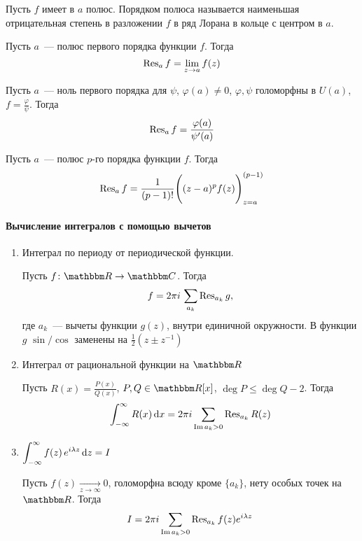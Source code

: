 \documentclass[12pt,timbord]{../../../notes}
\begin{document}
\begin{defn}\label{defn:tfcv::resuduepole::polord}
  Пусть $f$ имеет в $a$ полюс.
  Порядком полюса называется наименьшая отрицательная степень в разложении $f$ в ряд Лорана в
  кольце с центром в $a$.
\end{defn}

\begin{thrm}\label{thrm:tfcv::resuduepole::firt}
  Пусть $a$~--- полюс первого порядка функции $f$. Тогда
  \[
    \operatorname{Res}_a f =  \lim_{z\to a} f(z)
  \]
\end{thrm}
\begin{thrm}\label{thrm:tfcv::resuduepole::frac}
  Пусть $a$~--- ноль первого порядка для $\psi$, $\varphi(a) \neq 0$, $\varphi, \psi$ голоморфны в
  $U(a)$, $f = \frac{\varphi}{\psi}$. Тогда
  \[
    \operatorname{Res}_a f =  \frac{\varphi(a)}{\psi'(a)}
  \]
\end{thrm}

\begin{thrm}\label{thrm:tfcv::resuduepole::pirt}
  Пусть $a$~--- полюс $p$-го порядка функции $f$. Тогда
  \[
    \operatorname{Res}_a f =  \frac{1}{(p-1)!} \Biggl((z-a)^p f(z)\Biggr)^{(p-1)}_{z=a}
  \]
\end{thrm}

\paragraph{Вычисление интегралов с помощью вычетов}
\label{par:tfcv::intresidue}

\begin{enumerate}[I$\rangle$]
  \item Интеграл по периоду от периодической функции. \par
    Пусть $f\colon \R \to \C$. Тогда
    \[
      f = 2\pi i \, \sum_{a_k} \operatorname{Res}_{a_k} g,
    \]
    где $a_k$~--- вычеты функции $g(z)$, внутри единичной окружности. В функции $g$ $\sin/\cos$
    заменены на $\frac{1}{2} \left(z \pm z^{-1}\right)$ 
  \item Интеграл от рациональной функции на $\R$ \par
    Пусть $R(x) = \frac{P(x)}{Q(x)}$, $P, Q \in \R[x]$, $\deg P \leqslant \deg Q-2 $.  Тогда 
    \[
      \int_{-\infty}^{\infty} R(x) \,\mathrm{d} x= 2 \pi i \sum_{\operatorname{Im} a_k > 0} \operatorname{Res}_{a_k} R(z)
    \]
  \item $\displaystyle \int_{-\infty}^{\infty} f(z) \, e^{i \lambda z} \, \mathrm{d} z = I$ \par
  Пусть $f(z) \xrightarrow[z\to \infty]{}  0$, голоморфна всюду кроме $\{a_k\}$, нету особых точек
  на $\R$. Тогда
  \[
    I = 2 \pi i \sum_{\operatorname{Im} a_k > 0} \operatorname{Res}_{a_k} f(z) e^{i\lambda z}
  \]
\end{enumerate}
\end{document}

